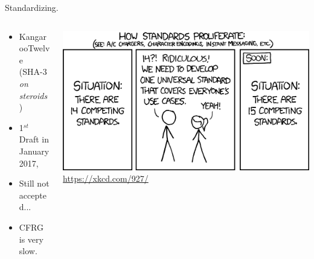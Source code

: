 \documentclass[usenames,dvipsnames,10pt,aspectratio=169]{beamer}
\begin{document}
\begin{frame}{Standardizing.}
	\vspace{2cm}
	\Large
	\begin{columns}
		\begin{column}{0.5\textwidth}
			\begin{itemize}
				\item KangarooTwelve\\
				      (SHA-3 \emph{on steroids})
				\item 1$^{st}$ Draft in January 2017,
				\item Still not accepted...
				\item CFRG is very slow.
			\end{itemize}
		\end{column}
		\begin{column}{0.5\textwidth}
			\begin{flushright}
				\includegraphics[width=\textwidth]{graphics/standards_2x.png}\\
				\small
				\url{https://xkcd.com/927/}
			\end{flushright}
		\end{column}
	\end{columns}
\end{frame}


\end{document}
